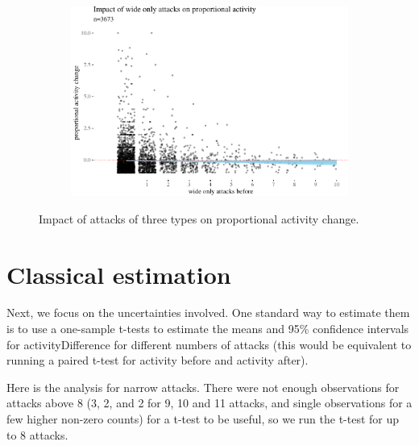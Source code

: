 \documentclass[10pt,]{scrartcl}
\begin{document}
\begin{figure}
\vspace{3mm}
\begin{subfigure}[b]{0.75\textwidth}

\begin{center}\includegraphics[width=1\linewidth]{redditAnalysisWalkthrough_files/figure-latex/unnamed-chunk-18-1} \end{center}

\end{subfigure}


\caption{Impact of attacks of three types on proportional activity change.}
\label{fig:propActivity}
\end{figure}

\section{Classical estimation}

Next, we focus on the uncertainties involved. One standard way to
estimate them is to use a one-sample t-tests to estimate the means and
95\% confidence intervals for \textsf{activityDifference} for different
numbers of attacks (this would be equivalent to running a paired t-test
for activity before and activity after).

Here is the analysis for narrow attacks. There were not enough
observations for attacks above 8 (3, 2, and 2 for 9, 10 and 11 attacks,
and single observations for a few higher non-zero counts) for a t-test
to be useful, so we run the t-test for up to 8 attacks.

\footnotesize
\end{document}
